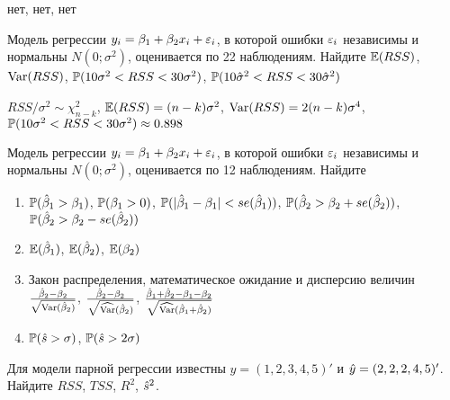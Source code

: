 \documentclass[pdftex,11pt,openany]{book}\usepackage[]{graphicx}\usepackage[]{color}
\begin{document}
\begin{solution}
нет, нет, нет 
\end{solution}



\begin{problem}
 Модель регрессии $y_i = \beta_1 + \beta_2 x_i + \e_i$, в которой ошибки
$\e_i$ независимы и нормальны $N(0;\sigma^2)$, оценивается по 22 наблюдениям. Найдите $\E(RSS)$, $\Var(RSS)$, $\P(10\sigma^2<RSS<30\sigma^2)$, $\P(10\hat{\sigma}^2<RSS<30\hat{\sigma}^2)$
\end{problem}

\begin{solution}
 $RSS/\sigma^2\sim\chi^2_{n-k}$, $\E(RSS)=(n-k)\sigma^2$, $\Var(RSS)=2(n-k)\sigma^4$, $\P(10\sigma^2<RSS<30\sigma^2)\approx 0.898$ 
\end{solution}


\begin{problem}
 Модель регрессии $y_i = \beta_1 + \beta_2 x_i + \e_i$, в которой ошибки
$\e_i$ независимы и нормальны $N(0;\sigma^2)$, оценивается по 12 наблюдениям. Найдите
\begin{enumerate}
\item $\P(\hb_1>\beta_1)$, $\P(\beta_1>0)$, $\P(|\hb_1-\beta_1|<se(\hb_1))$, $\P(\hb_2>\beta_2+se(\hb_2))$, $\P(\hb_2>\beta_2-se(\hb_2))$
\item $\E(\hb_1)$, $\E(\hb_2)$, $\E(\beta_2)$
\item Закон распределения, математическое ожидание и дисперсию величин $\frac{\hb_2-\beta_2}{\sqrt{\Var(\hb_2)}}$, $\frac{\hb_2-\beta_2}{\sqrt{\widehat{\Var}(\hb_2)}}$, $\frac{\hb_1+\hb_2-\beta_1-\beta_2}{\sqrt{\widehat{\Var}(\hb_1+\hb_2)}}$
\item $\P(\hs>\sigma)$, $\P(\hs>2\sigma)$
\end{enumerate}

\end{problem}

\begin{solution}
\end{solution}



\begin{problem}
 Для модели парной регрессии известны $y=(1, 2, 3, 4, 5)'$ и $\hy=(2, 2, 2, 4, 5)'$. Найдите $RSS$, $TSS$, $R^2$, $\hs^2$.
\end{problem}

\begin{solution}
\end{solution}
\end{document}
